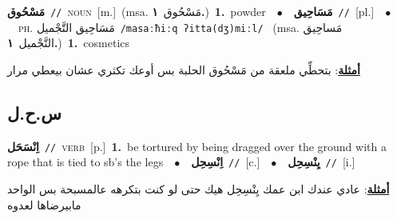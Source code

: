 \documentclass[10pt,a4paper,twoside]{article} %
\begin{document}
\begin{multicols}{2}
{\setlength\topsep{0pt}\textbf{\foreignlanguage{arabic}{مَسْحُوق}}\ {\color{gray}\texttt{//}\color{black}}\ \textsc{noun}\ [m.]\ \color{gray}(msa. \foreignlanguage{arabic}{مَسْحُوق}~\foreignlanguage{arabic}{\textbf{١.}})\color{black}\ \textbf{1.}~powder\ \ $\bullet$\ \ \setlength\topsep{0pt}\textbf{\foreignlanguage{arabic}{مَسَاحِيق}}\ {\color{gray}\texttt{//}\color{black}}\ [pl.]\ \ $\bullet$\ \ \textsc{ph.} \color{gray} \foreignlanguage{arabic}{مَسَاحِيق التَّجْميل}\color{black}\ {\color{gray}\texttt{/{\sffamily masaːħiːq ʔitta(dʒ)miːl}/}\color{black}}\ \color{gray} (msa. \foreignlanguage{arabic}{مَساحِيق التَّجْميل}~\foreignlanguage{arabic}{\textbf{١.}})\color{black}\ \textbf{1.}~cosmetics\  \begin{flushright}\color{gray}\foreignlanguage{arabic}{\textbf{\underline{\foreignlanguage{arabic}{أمثلة}}}: بتحطِّي ملعقة من مَسْحُوق الحلبة بس أوعك تكثري عشان بيعطي مرار}\end{flushright}\color{black}} \vspace{2mm}

\vspace{-3mm}
\subsection*{\color{blue}\foreignlanguage{arabic}{س.ح.ل}\color{blue}{}} 

{\setlength\topsep{0pt}\textbf{\foreignlanguage{arabic}{اِنْسَحَل}}\ {\color{gray}\texttt{//}\color{black}}\ \textsc{verb}\ [p.]\ \textbf{1.}~be tortured by being dragged over the ground with a rope that is tied to sb's the legs\ \ $\bullet$\ \ \setlength\topsep{0pt}\textbf{\foreignlanguage{arabic}{اِنْسِحِل}}\ {\color{gray}\texttt{//}\color{black}}\ [c.]\ \ $\bullet$\ \ \setlength\topsep{0pt}\textbf{\foreignlanguage{arabic}{يِنْسِحِل}}\ {\color{gray}\texttt{//}\color{black}}\ [i.]\  \begin{flushright}\color{gray}\foreignlanguage{arabic}{\textbf{\underline{\foreignlanguage{arabic}{أمثلة}}}: عادي عندك ابن عمك يِنْسِحِل هيك حتى لو كنت بتكرهه عالمسبحة بس الواحد مابيرضاها لعدوه}\end{flushright}\color{black}} \vspace{2mm}


\end{multicols}
\end{document}
